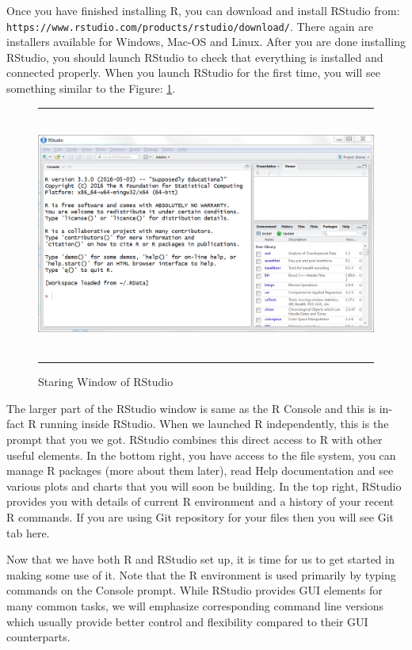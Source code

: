 \documentclass[10pt, letterpaper, twoside]{memoir}\usepackage{knitr}
\begin{document}
Once you have finished installing R, you can download and install RStudio from: \\ 
\verb|https://www.rstudio.com/products/rstudio/download/|. There again are installers available for Windows, Mac-OS and Linux. After you are done installing RStudio, you should launch RStudio to check that everything is installed and connected properly. When you launch RStudio for the first time, you will see something similar to the Figure: \ref{fig:rstudio}.

\begin{figure}
\rule{4in}{1pt}
\centering
\includegraphics[height=3in]{images/rstudio.png}
\caption{Staring Window of RStudio}
\label{fig:rstudio}
\rule{4in}{1pt}
\end{figure}

The larger part of the RStudio window is same as the R Console and this is in-fact R running inside RStudio. When we launched R independently, this is the prompt that you we got. RStudio combines this direct access to R with other useful elements. In the bottom right, you have access to the file system, you can manage R packages (more about them later), read Help documentation and see various plots and charts that you will soon be building. In the top right, RStudio provides you with details of current R environment and a history of your recent R commands. If you are using Git repository for your files then you will see Git tab here.

Now that we have both R and RStudio set up, it is time for us to get started in making some use of it. Note that the R environment is used primarily by typing commands on the Console prompt. While RStudio provides GUI elements for many common tasks, we will emphasize corresponding command line versions which usually provide better control and flexibility compared to their GUI counterparts. 
\end{document}
